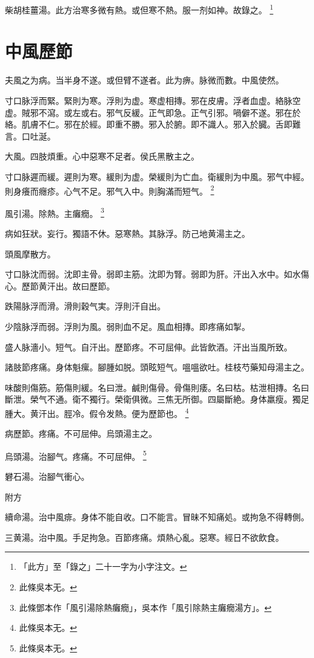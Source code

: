 \documentclass[12pt,oneside,UTF8,b5paper]{ctexbook}她她她她她她她
\begin{document}
柴胡桂薑湯。此方治寒多微有熱。或但寒不熱。服一剂如神。故錄之。
	\footnote{「此方」至「錄之」二十一字为小字注文。}

\chapter{中風歷節}

夫風之为病。当半身不遂。或但臂不遂者。此为痹。脉微而數。中風使然。

寸口脉浮而緊。緊則为寒。浮則为虚。寒虚相摶。邪在皮膚。浮者血虚。絡脉空虚。賊邪不瀉。或左或右。邪气反緩。正气即急。正气引邪。喎僻不遂。邪在於絡。肌膚不仁。邪在於經。即重不勝。邪入於腑。即不識人。邪入於臓。舌即難言。口吐涎。

大風。四肢煩重。心中惡寒不足者。侯氏黑散主之。

寸口脉遲而緩。遲則为寒。緩則为虚。榮緩則为亡血。衛緩則为中風。邪气中經。則身癢而癮疹。心气不足。邪气入中。則胸滿而短气。
	\footnote{此條吳本无。}

風引湯。除熱。主癱癇。
	\footnote{此條鄧本作「風引湯除熱癱癇」，吳本作「風引除熱主癱癇湯方」。}

病如狂狀。妄行。獨語不休。惡寒熱。其脉浮。防己地黄湯主之。

頭風摩散方。

寸口脉沈而弱。沈即主骨。弱即主筋。沈即为腎。弱即为肝。汗出入水中。如水傷心。歷節黄汗出。故曰歷節。

跌陽脉浮而滑。滑則穀气実。浮則汗自出。

少陰脉浮而弱。浮則为風。弱則血不足。風血相摶。即疼痛如掣。

盛人脉濇小。短气。自汗出。歷節疼。不可屈伸。此皆飲酒。汗出当風所致。

諸肢節疼痛。身体魁瘰。腳腫如脱。頭眩短气。嗢嗢欲吐。桂枝芍藥知母湯主之。

味酸則傷筋。筋傷則緩。名曰泄。鹹則傷骨。骨傷則痿。名曰枯。枯泄相摶。名曰斷泄。榮气不通。衛不獨行。榮衛俱微。三焦无所御。四屬斷絶。身体羸瘦。獨足腫大。黄汗出。脛冷。假令发熱。便为歷節也。
	\footnote{此條吳本无。}

病歷節。疼痛。不可屈伸。烏頭湯主之。

烏頭湯。治腳气。疼痛。不可屈伸。
	\footnote{此條吳本无。}

礬石湯。治腳气衝心。

附方

續命湯。治中風痱。身体不能自收。口不能言。冒昧不知痛処。或拘急不得轉側。

三黄湯。治中風。手足拘急。百節疼痛。煩熱心亂。惡寒。經日不欲飲食。
\end{document}
